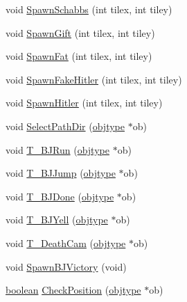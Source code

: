 \begin{DoxyCompactItemize}
\item 
void \hyperlink{WL__ACT2_8C_a45e5e04ad0e19428f6c6fe0f10ef10c9}{SpawnSchabbs} (int tilex, int tiley)
\item 
void \hyperlink{WL__ACT2_8C_a926bfed8ef17ab18d4acb24492765cad}{SpawnGift} (int tilex, int tiley)
\item 
void \hyperlink{WL__ACT2_8C_a3ba9b8d2b90684238cf1054a06991040}{SpawnFat} (int tilex, int tiley)
\item 
void \hyperlink{WL__ACT2_8C_a955e2f73e53dd332c0c69b2030925452}{SpawnFakeHitler} (int tilex, int tiley)
\item 
void \hyperlink{WL__ACT2_8C_a6f45b135127503a06762199d5c55c790}{SpawnHitler} (int tilex, int tiley)
\item 
void \hyperlink{WL__ACT2_8C_a775ddb0e17130c10acd55e069c04e929}{SelectPathDir} (\hyperlink{structobjstruct}{objtype} $\ast$ob)
\item 
void \hyperlink{WL__ACT2_8C_a7a0e7fd0cd65af1f29fb483e7690e46e}{T\_\-BJRun} (\hyperlink{structobjstruct}{objtype} $\ast$ob)
\item 
void \hyperlink{WL__ACT2_8C_a91daf02857f7ca74eae329b0329fb66e}{T\_\-BJJump} (\hyperlink{structobjstruct}{objtype} $\ast$ob)
\item 
void \hyperlink{WL__ACT2_8C_a27883d147b02f6be1377750ae333c8e6}{T\_\-BJDone} (\hyperlink{structobjstruct}{objtype} $\ast$ob)
\item 
void \hyperlink{WL__ACT2_8C_afaa6d69df9becbc26904c2875fd261ed}{T\_\-BJYell} (\hyperlink{structobjstruct}{objtype} $\ast$ob)
\item 
void \hyperlink{WL__ACT2_8C_a135c06326290c2ba996d4c9732837f99}{T\_\-DeathCam} (\hyperlink{structobjstruct}{objtype} $\ast$ob)
\item 
void \hyperlink{WL__ACT2_8C_ac90f1326e552ec8b410ee251e79219c0}{SpawnBJVictory} (void)
\item 
\hyperlink{ID__HEAD_8H_a7c6368b321bd9acd0149b030bb8275ed}{boolean} \hyperlink{WL__ACT2_8C_afd9058ec384ce8d3af9cb7be3735c1b9}{CheckPosition} (\hyperlink{structobjstruct}{objtype} $\ast$ob)
\end{DoxyCompactItemize}
